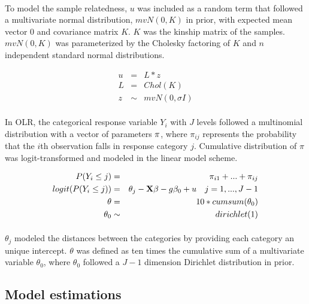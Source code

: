 \documentclass[12pt]{article}
\begin{document}
\paragraph{}{
To model the sample relatedness, $u$ was included as a random term that followed a multivariate normal distribution, $mvN(0, K)$ in prior, with expected mean vector 0 and covariance matrix $K$. $K$ was the kinship matrix of the samples. $mvN(0, K)$ was parameterized by the Cholesky factoring of $K$ and $n$ independent standard normal distributions.
}

\begin{eqnarray}
   u & = &  L * z \\
   L & = & Chol(K) \\
   z & \sim & mvN(0, \sigma I)
\end{eqnarray}

\paragraph{}{
In OLR, the categorical response variable $Y_i$ with $J$ levels followed a multinomial distribution with a vector of parameters $\bold{\pi}$, where $\pi_{ij}$ represents the probability that the $i$th observation falls in response category $j$. Cumulative distribution of $\pi$ was logit-transformed and modeled in the linear model scheme.
}

\begin{eqnarray}
  P(Y_i \leq j) & = & \pi_{i1} + ... + \pi_{ij} \\
  logit(P(Y_i \leq j) ) & = & \theta_j - \bold{X} \beta - g \beta_0 + u \quad j = 1,..., J-1 \\
  \theta & = & 10 * cumsum(\theta_0) \\
  \theta_0 & \sim & dirichlet(1)
\end{eqnarray}

\paragraph{}{
${\theta_j}$ modeled the distances between the categories by providing each category an unique intercept. $\theta$ was defined as ten times the cumulative sum of a multivariate variable $\theta_0$, where $\theta_0$ followed a $J-1$ dimension Dirichlet distribution in prior. 
}

\subsection*{Model estimations}
\end{document}
